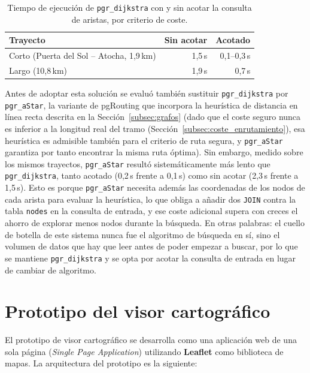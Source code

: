 \begin{table}[htbp]
\centering
\begin{tabular}{lrr}
\hline
\textbf{Trayecto} & \textbf{Sin acotar} & \textbf{Acotado} \\
\hline
Corto (Puerta del Sol -- Atocha, 1,9\,km) & 1,5\,s & 0,1--0,3\,s \\
Largo (10,8\,km) & 1,9\,s & 0,7\,s \\
\hline
\end{tabular}
\caption{Tiempo de ejecución de \texttt{pgr\_dijkstra} con y sin acotar la consulta de aristas, por criterio de coste.}
\label{tab:optimizacion_dijkstra}
\end{table}

Antes de adoptar esta solución se evaluó también sustituir \texttt{pgr\_dijkstra} por \texttt{pgr\_aStar}, la variante de pgRouting que incorpora la heurística de distancia en línea recta descrita en la Sección~\ref{subsec:grafos} (dado que el coste seguro nunca es inferior a la longitud real del tramo (Sección~\ref{subsec:coste_enrutamiento}), esa heurística es admisible también para el criterio de ruta segura, y \texttt{pgr\_aStar} garantiza por tanto encontrar la misma ruta óptima). Sin embargo, medido sobre los mismos trayectos, \texttt{pgr\_aStar} resultó sistemáticamente más lento que \texttt{pgr\_dijkstra}, tanto acotado (0,2\,s frente a 0,1\,s) como sin acotar (2,3\,s frente a 1,5\,s). Esto es porque \texttt{pgr\_aStar} necesita además las coordenadas de los nodos de cada arista para evaluar la heurística, lo que obliga a añadir dos \texttt{JOIN} contra la tabla \texttt{nodes} en la consulta de entrada, y ese coste adicional supera con creces el ahorro de explorar menos nodos durante la búsqueda. En otras palabras: el cuello de botella de este sistema nunca fue el algoritmo de búsqueda en sí, sino el volumen de datos que hay que leer antes de poder empezar a buscar, por lo que se mantiene \texttt{pgr\_dijkstra} y se opta por acotar la consulta de entrada en lugar de cambiar de algoritmo.

\section{Prototipo del visor cartográfico}
\label{sec:visor}

El prototipo de visor cartográfico se desarrolla como una aplicación web de una sola página (\textit{Single Page Application}) utilizando \textbf{Leaflet} como biblioteca de mapas. La arquitectura del prototipo es la siguiente:

